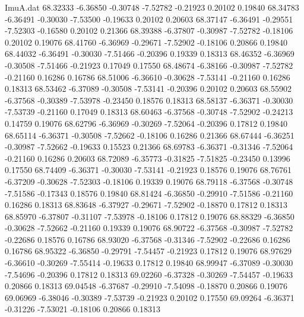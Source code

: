 \begin{filecontents}{ImuA.dat}
  68.32333   -6.36850   -0.30748   -7.52782   -0.21923    0.20102    0.19840
  68.34783   -6.36491   -0.30030   -7.53500   -0.19633    0.20102    0.20603
  68.37147   -6.36491   -0.29551   -7.52303   -0.16580    0.20102    0.21366
  68.39388   -6.37807   -0.30987   -7.52782   -0.18106    0.20102    0.19076
  68.41760   -6.36969   -0.29671   -7.52902   -0.18106    0.20866    0.19840
  68.44032   -6.36491   -0.30030   -7.51466   -0.20396    0.19339    0.18313
  68.46352   -6.36969   -0.30508   -7.51466   -0.21923    0.17049    0.17550
  68.48674   -6.38166   -0.30987   -7.52782   -0.21160    0.16286    0.16786
  68.51006   -6.36610   -0.30628   -7.53141   -0.21160    0.16286    0.18313
  68.53462   -6.37089   -0.30508   -7.53141   -0.20396    0.20102    0.20603
  68.55902   -6.37568   -0.30389   -7.53978   -0.23450    0.18576    0.18313
  68.58137   -6.36371   -0.30030   -7.53739   -0.21160    0.17049    0.18313
  68.60463   -6.37568   -0.30748   -7.52902   -0.24213    0.14759    0.19076
  68.62796   -6.36969   -0.30269   -7.52064   -0.20396    0.17812    0.19840
  68.65114   -6.36371   -0.30508   -7.52662   -0.18106    0.16286    0.21366
  68.67444   -6.36251   -0.30987   -7.52662   -0.19633    0.15523    0.21366
  68.69783   -6.36371   -0.31346   -7.52064   -0.21160    0.16286    0.20603
  68.72089   -6.35773   -0.31825   -7.51825   -0.23450    0.13996    0.17550
  68.74409   -6.36371   -0.30030   -7.53141   -0.21923    0.18576    0.19076
  68.76761   -6.37209   -0.30628   -7.52303   -0.18106    0.19339    0.19076
  68.79118   -6.37568   -0.30748   -7.51586   -0.17343    0.18576    0.19840
  68.81424   -6.36850   -0.29910   -7.51586   -0.21160    0.16286    0.18313
  68.83648   -6.37927   -0.29671   -7.52902   -0.18870    0.17812    0.18313
  68.85970   -6.37807   -0.31107   -7.53978   -0.18106    0.17812    0.19076
  68.88329   -6.36850   -0.30628   -7.52662   -0.21160    0.19339    0.19076
  68.90722   -6.37568   -0.30987   -7.52782   -0.22686    0.18576    0.16786
  68.93020   -6.37568   -0.31346   -7.52902   -0.22686    0.16286    0.16786
  68.95322   -6.36850   -0.29791   -7.54457   -0.21923    0.17812    0.19076
  68.97629   -6.36610   -0.30269   -7.55414   -0.19633    0.17812    0.19840
  68.99947   -6.37089   -0.30030   -7.54696   -0.20396    0.17812    0.18313
  69.02260   -6.37328   -0.30269   -7.54457   -0.19633    0.20866    0.18313
  69.04548   -6.37687   -0.29910   -7.54098   -0.18870    0.20866    0.19076
  69.06969   -6.38046   -0.30389   -7.53739   -0.21923    0.20102    0.17550
  69.09264   -6.36371   -0.31226   -7.53021   -0.18106    0.20866    0.18313

\end{filecontents}
